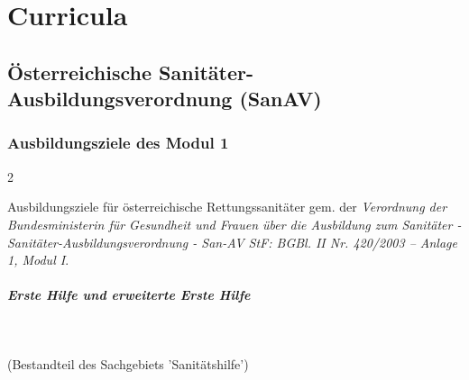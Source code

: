 
\chapter{Curricula}
\label{chp:INT}



\section{Österreichische Sanitäter-Ausbildungsverordnung
(SanAV)}


\subsection{Ausbildungsziele des Modul 1}


\begin{WidePar}
\scriptsize

\begin{multicols}{2}

Ausbildungsziele für österreichische Rettungssanitäter gem.
der \emph{Verordnung der Bundesministerin für Gesundheit und
Frauen über die Ausbildung zum Sanitäter -
Sanitäter-Ausbildungsverordnung - San-AV StF: BGBl. II Nr.
420/2003 -- Anlage 1, Modul I}.


\paragraph{Erste Hilfe und erweiterte Erste Hilfe}~
  
  (Bestandteil des Sachgebiets 'Sanitätshilfe')
  

\end{multicols}
\end{WidePar}
